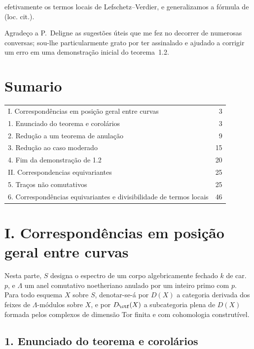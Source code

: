 efetivamente os termos locais de Lefschetz--Verdier, e generalizamos a fórmula de (loc. cit.).

Agradeço a P.~Deligne as sugestões úteis que me fez no decorrer de numerosas conversas; sou-lhe particularmente grato por ter assinalado e ajudado a corrigir um erro em uma demonstração inicial do teorema~1.2.

\section*{Sumario}
\begin{tabular}{@{}p{}r@{}}
I. Correspondências em posição geral entre curvas & 3\\
1. Enunciado do teorema e corolários & 3\\
2. Redução a um teorema de anulação & 9\\
3. Redução ao caso moderado & 15\\
4. Fim da demonstração de 1.2 & 20\\
II. Correspondencias equivariantes & 25\\
5. Traços não comutativos & 25\\
6. Correspondências equivariantes e divisibilidade de termos locais & 46
\end{tabular}

\section*{I. Correspondências em posição geral entre curvas}

Nesta parte, $S$ designa o espectro de um corpo algebricamente fechado $k$ de car.~$p$, e $\Lambda$ um anel comutativo noetheriano anulado por um inteiro primo com $p$. Para todo esquema $X$ sobre $S$, denotar-se-á por $D(X)$ a categoria derivada dos feixes de $\Lambda$-módulos sobre $X$, e por $D_{\ctf}(X)$ a subcategoria plena de $D(X)$ formada pelos complexos de dimensão Tor finita e com cohomologia construtível.

\subsection*{1. Enunciado do teorema e corolários}
